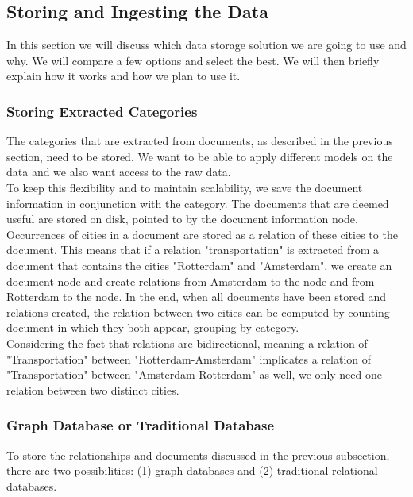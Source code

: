 \subsection{Storing and Ingesting the Data}
In this section we will discuss which data storage solution we are going to use and why. We will compare a few options and select the best. We will then briefly explain how it works and how we plan to use it.

\subsubsection{Storing Extracted Categories}
The categories that are extracted from documents, as described in the previous section, need to be stored. We want to be able to apply different models on the data and we also want access to the raw data. \\
To keep this flexibility and to maintain scalability, we save the document information in conjunction with the category. The documents that are deemed useful are stored on disk, pointed to by the document information node. Occurrences of cities in a document are stored as a relation of these cities to the document. This means that if a relation "transportation" is extracted from a document that contains the cities "Rotterdam" and "Amsterdam", we create an document node and create relations from Amsterdam to the node and from Rotterdam to the node. In the end, when all documents have been stored and relations created, the relation between two cities can be computed by counting document in which they both appear, grouping by category. \\
Considering the fact that relations are bidirectional, meaning a relation of "Transportation" between "Rotterdam-Amsterdam" implicates a relation of "Transportation" between "Amsterdam-Rotterdam" as well, we only need one relation between two distinct cities.

\subsubsection{Graph Database or Traditional Database}
To store the relationships and documents discussed in the previous subsection, there are two possibilities: (1) graph databases and (2) traditional relational databases.

